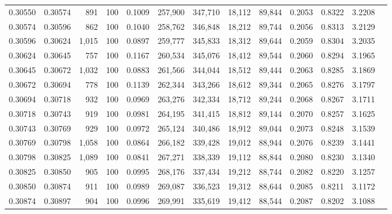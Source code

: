 \begin{tabular}{rrrrrrrrrrrrr}
0.30550 & 0.30574 &   891 & 100 &                                     0.1009 & 257,900 & 347,710 &  18,112 &  89,844 & 0.2053 & 0.8322 & 3.2208 \\
0.30574 & 0.30596 &   862 & 100 &                                     0.1040 & 258,762 & 346,848 &  18,212 &  89,744 & 0.2056 & 0.8313 & 3.2129 \\
0.30596 & 0.30624 & 1,015 & 100 &                                     0.0897 & 259,777 & 345,833 &  18,312 &  89,644 & 0.2059 & 0.8304 & 3.2035 \\
0.30624 & 0.30645 &   757 & 100 &                                     0.1167 & 260,534 & 345,076 &  18,412 &  89,544 & 0.2060 & 0.8294 & 3.1965 \\
0.30645 & 0.30672 & 1,032 & 100 &                                     0.0883 & 261,566 & 344,044 &  18,512 &  89,444 & 0.2063 & 0.8285 & 3.1869 \\
0.30672 & 0.30694 &   778 & 100 &                                     0.1139 & 262,344 & 343,266 &  18,612 &  89,344 & 0.2065 & 0.8276 & 3.1797 \\
0.30694 & 0.30718 &   932 & 100 &                                     0.0969 & 263,276 & 342,334 &  18,712 &  89,244 & 0.2068 & 0.8267 & 3.1711 \\
0.30718 & 0.30743 &   919 & 100 &                                     0.0981 & 264,195 & 341,415 &  18,812 &  89,144 & 0.2070 & 0.8257 & 3.1625 \\
0.30743 & 0.30769 &   929 & 100 &                                     0.0972 & 265,124 & 340,486 &  18,912 &  89,044 & 0.2073 & 0.8248 & 3.1539 \\
0.30769 & 0.30798 & 1,058 & 100 &                                     0.0864 & 266,182 & 339,428 &  19,012 &  88,944 & 0.2076 & 0.8239 & 3.1441 \\
0.30798 & 0.30825 & 1,089 & 100 &                                     0.0841 & 267,271 & 338,339 &  19,112 &  88,844 & 0.2080 & 0.8230 & 3.1340 \\
0.30825 & 0.30850 &   905 & 100 &                                     0.0995 & 268,176 & 337,434 &  19,212 &  88,744 & 0.2082 & 0.8220 & 3.1257 \\
0.30850 & 0.30874 &   911 & 100 &                                     0.0989 & 269,087 & 336,523 &  19,312 &  88,644 & 0.2085 & 0.8211 & 3.1172 \\
0.30874 & 0.30897 &   904 & 100 &                                     0.0996 & 269,991 & 335,619 &  19,412 &  88,544 & 0.2087 & 0.8202 & 3.1088 \\

\end{tabular}
